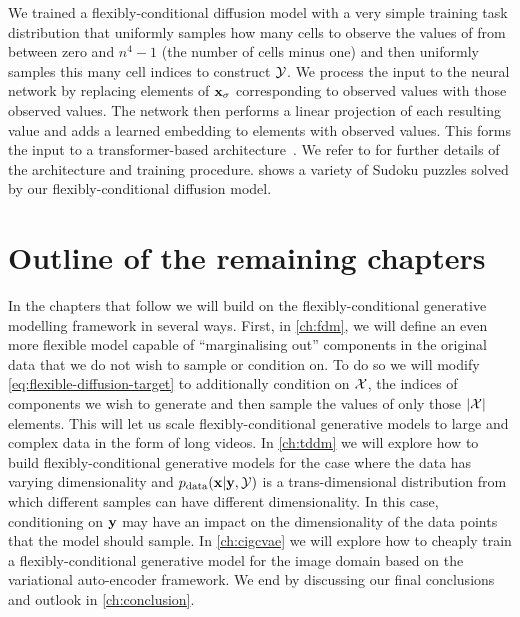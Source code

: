 We trained a flexibly-conditional diffusion model with a very simple training task distribution that uniformly samples how many cells to observe the values of from between zero and $n^4-1$ (the number of cells minus one) and then uniformly samples this many cell indices to construct ${\mathcal{Y}}$. We process the input to the neural network by replacing elements of ${\mathbf{x}}_\sigma$ corresponding to observed values with those observed values. The network then performs a linear projection of each resulting value and adds a learned embedding to elements with observed values. This forms the input to a transformer-based architecture~\citep{vaswani2017attention}. We refer to \citet{weilbach2023graphically} for further details of the architecture and training procedure.  shows a variety of Sudoku puzzles solved by our flexibly-conditional diffusion model.

\section{Outline of the remaining chapters}
In the chapters that follow we will build on the flexibly-conditional generative modelling framework in several ways. First, in \cref{ch:fdm}, we will define an even more flexible model capable of ``marginalising out'' components in the original data that we do not wish to sample or condition on. To do so we will modify \cref{eq:flexible-diffusion-target} to additionally condition on ${\mathcal{X}}$, the indices of components we wish to generate and then sample the values of only those $|{\mathcal{X}}|$ elements. This will let us scale flexibly-conditional generative models to large and complex data in the form of long videos. In \cref{ch:tddm} we will explore how to build flexibly-conditional generative models for the case where the data has varying dimensionality and $p_{\rm{data}}({\mathbf{x}} | {\mathbf{y}}, {\mathcal{Y}})$ is a trans-dimensional distribution from which different samples can have different dimensionality. In this case, conditioning on ${\mathbf{y}}$ may have an impact on the dimensionality of the data points that the model should sample. In \cref{ch:cigcvae} we will explore how to cheaply train a flexibly-conditional generative model for the image domain based on the variational auto-encoder framework. We end by discussing our final conclusions and outlook in \cref{ch:conclusion}.
